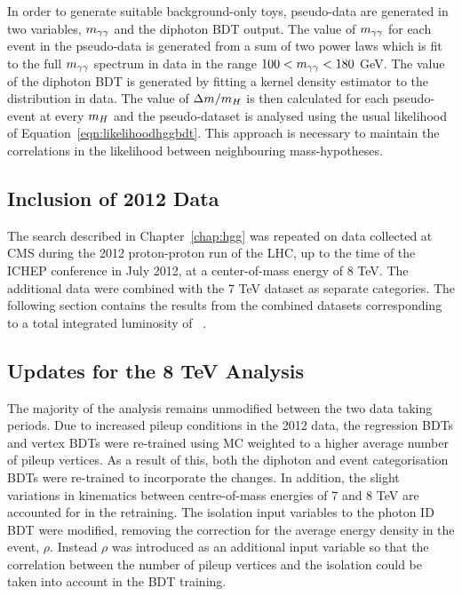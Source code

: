 In order to generate suitable background-only toys, pseudo-data are generated in two variables, 
$m_{\gamma\gamma}$ and the diphoton BDT output. The value of $m_{\gamma\gamma}$ for each event in the pseudo-data 
is generated from a sum of two power laws which is 
fit to the full $m_{\gamma\gamma}$ spectrum in data in the range $100 < m_{\gamma\gamma} < 180$ GeV. The value of the diphoton BDT 
is generated by fitting a kernel density estimator to the distribution in data. The value of $\Delta m/m_{H}$ is then 
calculated for each pseudo-event at every $m_{H}$ and the pseudo-dataset is analysed using the usual likelihood
of Equation~\ref{eqn:likelihoodhggbdt}. This approach is necessary to maintain
the correlations in the likelihood between neighbouring mass-hypotheses.


\subsection{Inclusion of 2012 Data}
\label{sec:8tev}

The search described in Chapter~\ref{chap:hgg} was repeated on data collected at CMS 
during the 2012 proton-proton run of the LHC, up to the time of the ICHEP conference in July 2012,  
at a center-of-mass energy of 8 TeV. The additional 
data were combined with the 7 TeV dataset as separate categories. 
The following section contains the results from the combined datasets corresponding to a 
total integrated luminosity of \clumicomb~\cite{HIG-12-028}.

\subsection{Updates for the 8 TeV Analysis}
\label{sec:updates8TeV}

The majority of the analysis remains unmodified between the two data taking periods.
Due to increased pileup conditions in the 2012 data, the regression BDTs and vertex BDTs
were re-trained using MC weighted to a higher average number of pileup vertices. 
As a result of this, both the diphoton and event categorisation BDTs were re-trained 
to incorporate the changes. In addition, the slight variations in kinematics between 
centre-of-mass energies of 7 and 8 TeV are accounted for in the retraining.
The isolation input variables to the photon ID BDT were modified, removing the correction
for the average energy density in the event, $\rho$. 
Instead $\rho$ was introduced as an additional input
variable so that the correlation between the number of pileup vertices and the isolation
could be taken into account in the BDT training. 

